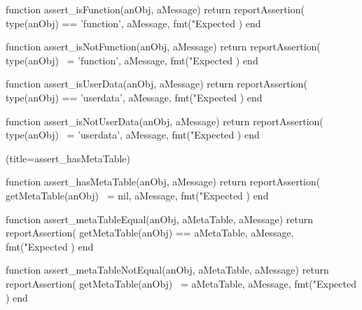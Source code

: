 \stopTestSuite

\startTestSuite[title=assert_isFunction]

\startLuaCode
function assert_isFunction(anObj, aMessage)
  return reportAssertion(
    type(anObj) == 'function',
    aMessage,
    fmt("Expected %
  )
end
\stopLuaCode

\stopTestSuite

\startTestSuite[title=assert_isNotFunction]

\startLuaCode
function assert_isNotFunction(anObj, aMessage)
  return reportAssertion(
    type(anObj) ~= 'function',
    aMessage,
    fmt("Expected %
  )
end
\stopLuaCode

\stopTestSuite

\startTestSuite[title=assert_isUserData]

\startLuaCode
function assert_isUserData(anObj, aMessage)
  return reportAssertion(
    type(anObj) == 'userdata',
    aMessage,
    fmt("Expected %
  )
end
\stopLuaCode

\stopTestSuite

\startTestSuite[title=assert_isNotUserData]

\startLuaCode
function assert_isNotUserData(anObj, aMessage)
  return reportAssertion(
    type(anObj) ~= 'userdata',
    aMessage,
    fmt("Expected %
  )
end
\stopLuaCode

\stopTestSuite

\startTestSuite(title=assert_hasMetaTable)

\startLuaCode
function assert_hasMetaTable(anObj, aMessage)
  return reportAssertion(
    getMetaTable(anObj) ~= nil,
    aMessage,
    fmt("Expected %
  )
end
\stopLuaCode

\stopTestSuite

\startTestSuite[title=assert_metaTableEquals]

\startLuaCode
function assert_metaTableEqual(anObj, aMetaTable, aMessage)
  return reportAssertion(
    getMetaTable(anObj) == aMetaTable,
    aMessage,
    fmt("Expected %
  )
end
\stopLuaCode

\stopTestSuite

\startTestSuite[title=assert_metaTableNotEqual]

\startLuaCode
function assert_metaTableNotEqual(anObj, aMetaTable, aMessage)
  return reportAssertion(
    getMetaTable(anObj) ~= aMetaTable,
    aMessage,
    fmt("Expected %
  )
end
\stopLuaCode

